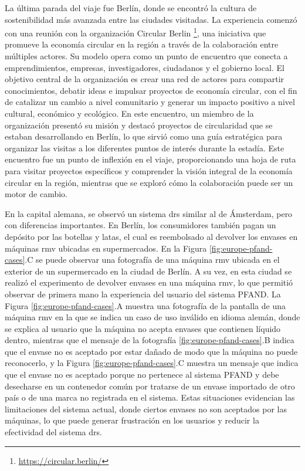 La última parada del viaje fue Berlín, donde se encontró la cultura de sostenibilidad más avanzada entre las ciudades visitadas. La experiencia comenzó con una reunión con la organización Circular Berlin \footnote{\url{https://circular.berlin/}}, una iniciativa que promueve la economía circular en la región a través de la colaboración entre múltiples actores. Su modelo opera como un punto de encuentro que conecta a emprendimientos, empresas, investigadores, ciudadanos y el gobierno local. El objetivo central de la organización es crear una red de actores para compartir conocimientos, debatir ideas e impulsar proyectos de economía circular, con el fin de catalizar un cambio a nivel comunitario y generar un impacto positivo a nivel cultural, económico y ecológico. En este encuentro, un miembro de la organización presentó su misión y destacó proyectos de circularidad que se estaban desarrollando en Berlín, lo que sirvió como una guía estratégica para organizar las visitas a los diferentes puntos de interés durante la estadía. Este encuentro fue un punto de inflexión en el viaje, proporcionando una hoja de ruta para visitar proyectos específicos y comprender la visión integral de la economía circular en la región, mientras que se exploró cómo la colaboración puede ser un motor de cambio.

En la capital alemana, se observó un sistema \acrshort{drs} similar al de Ámsterdam, pero con diferencias importantes. En Berlín, los consumidores también pagan un depósito por las botellas y latas, el cual es reembolsado al devolver los envases en máquinas \acrshort{rmv} ubicadas en supermercados. En la Figura \ref{fig:europe-pfand-cases}.C se puede observar una fotografía de una máquina \acrshort{rmv} ubicada en el exterior de un supermercado en la ciudad de Berlín. A su vez, en esta ciudad se realizó el experimento de devolver envases en una máquina \acrshort{rmv}, lo que permitió observar de primera mano la experiencia del usuario del sistema PFAND. La Figura \ref{fig:europe-pfand-cases}.A muestra una fotografía de la pantalla de una máquina \acrshort{rmv} en la que se indica un caso de uso inválido en idioma alemán, donde se explica al usuario que la máquina no acepta envases que contienen líquido dentro, mientras que el mensaje de la fotografía \ref{fig:europe-pfand-cases}.B indica que el envase no es aceptado por estar dañado de modo que la máquina no puede reconocerlo, y la Figura \ref{fig:europe-pfand-cases}.C muestra un mensaje que indica que el envase no es aceptado porque no pertenece al sistema PFAND y debe desecharse en un contenedor común por tratarse de un envase importado de otro país o de una marca no registrada en el sistema. Estas situaciones evidencian las limitaciones del sistema actual, donde ciertos envases no son aceptados por las máquinas, lo que puede generar frustración en los usuarios y reducir la efectividad del sistema \acrshort{drs}. 

